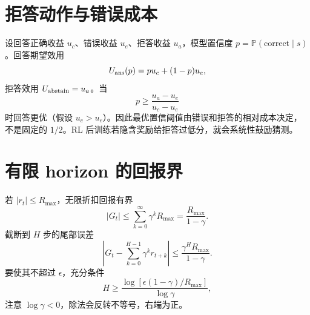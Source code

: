 \documentclass[11pt]{article}
\numberwithin{equation}{section}
\newcommand{\Pp}{\mathbb{P}}
\newcommand{\1}{\mathbf{1}}
\begin{document}
\section{拒答动作与错误成本}

设回答正确收益 $u_c$、错误收益 $u_e$、拒答收益 $u_a$，模型置信度
$p=\Pp(\text{correct}\mid s)$。回答期望效用
\begin{equation}
 U_{\rm ans}(p)=pu_c+(1-p)u_e,
\end{equation}
拒答效用 $U_{\rm abstain}=u_a$。当
\begin{equation}
 p\ge\frac{u_a-u_e}{u_c-u_e}
\end{equation}
时回答更优（假设 $u_c>u_e$）。因此最优置信阈值由错误和拒答的相对成本决定，
不是固定的 $1/2$。RL 后训练若隐含奖励给拒答过低分，就会系统性鼓励猜测。

\section{有限 horizon 的回报界}

若 $|r_t|\le R_{\max}$，无限折扣回报有界
\begin{equation}
 |G_t|\le\sum_{k=0}^{\infty}\gamma^kR_{\max}
 =\frac{R_{\max}}{1-\gamma}.
\end{equation}
截断到 $H$ 步的尾部误差
\begin{equation}
 \left|G_t-\sum_{k=0}^{H-1}\gamma^kr_{t+k}\right|
 \le\frac{\gamma^HR_{\max}}{1-\gamma}.
\end{equation}
要使其不超过 $\epsilon$，充分条件
\begin{equation}
 H\ge\frac{\log[\epsilon(1-\gamma)/R_{\max}]}{\log\gamma},
\end{equation}
注意 $\log\gamma<0$，除法会反转不等号，右端为正。
\end{document}
